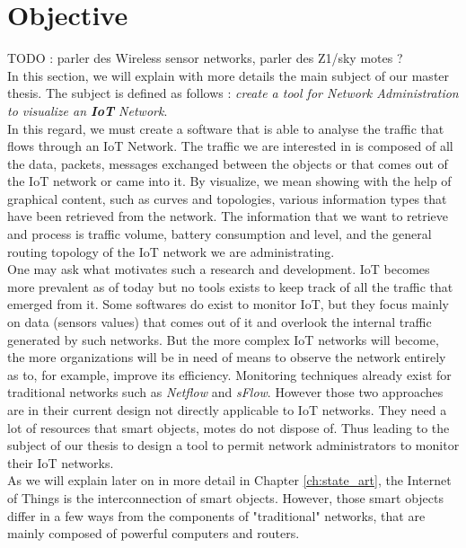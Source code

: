 \chapter{Objective} \label{ch:objective}

TODO : parler des Wireless sensor networks, parler des Z1/sky motes ? \\

In this section, we will explain with more details the main subject of our master thesis. The subject is defined as follows : \textit{create a tool for Network Administration to visualize an \textbf{IoT} Network}.\\

In this regard, we must create a software that is able to analyse the traffic that flows through an IoT Network. The traffic we are interested in is composed of all the data, packets, messages exchanged between the objects or that comes out of the IoT network or came into it. By visualize, we mean showing with the help of graphical content, such as curves and topologies, various information types that have been retrieved from the network. The information that we want to retrieve and process is traffic volume, battery consumption and level, and the general routing topology of the IoT network we are administrating. \\

One may ask what motivates such a research and development. IoT becomes more prevalent as of today but no tools exists to keep track of all the traffic that emerged from it. Some softwares do exist to monitor IoT, but they focus mainly on data (sensors values) that comes out of it and overlook the internal traffic generated by such networks. But the more complex IoT networks will become, the more organizations will be in need of means to observe the network entirely as to, for example, improve its efficiency. Monitoring techniques already exist for traditional networks such as \textit{Netflow} and \textit{sFlow}. However those two approaches are in their current design not directly applicable to IoT networks. They need a lot of resources that smart objects, motes do not dispose of. Thus leading to the subject of our thesis to design a tool to permit network administrators to monitor their IoT networks.\\

As we will explain later on in more detail in Chapter \ref{ch:state_art}, the Internet of Things is the interconnection of smart objects. However, those smart objects differ in a few ways from the components of "traditional" networks, that are mainly composed of powerful computers and routers.\\

